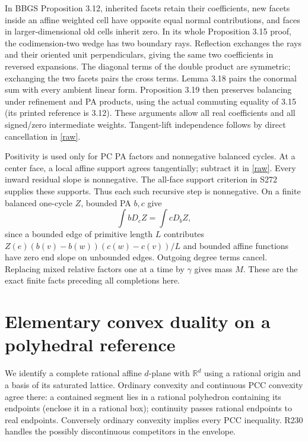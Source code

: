 \documentclass[11pt]{article}
\newcommand{\R}{\mathbb R}
\begin{document}
In BBGS Proposition 3.12, inherited facets retain their coefficients,
new facets inside an affine weighted cell have opposite equal normal
contributions, and faces in larger-dimensional old cells inherit zero.
In its whole Proposition 3.15 proof, the codimension-two wedge has two
boundary rays. Reflection exchanges the rays and their oriented unit
perpendiculars, giving the same two coefficients in reversed expansions.
The diagonal terms of the double product are symmetric; exchanging the
two facets pairs the cross terms. Lemma 3.18 pairs the conormal sum with
every ambient linear form. Proposition 3.19 then preserves balancing
under refinement and PA products, using the actual commuting equality
of 3.15 (its printed reference is 3.12). These arguments allow all real
coefficients and all signed/zero intermediate weights. Tangent-lift
independence follows by direct cancellation in \eqref{raw}.

Positivity is used only for PC PA factors and nonnegative balanced
cycles. At a center face, a local affine support agrees tangentially;
subtract it in \eqref{raw}. Every inward residual slope is nonnegative.
The all-face support criterion in S272 supplies these supports. Thus
each such recursive step is nonnegative. On a finite balanced one-cycle
$Z$, bounded PA $b,c$ give
\[
 \int bD_c Z=\int cD_b Z,
\]
since a bounded edge of primitive length $L$ contributes
$Z(e)(b(v)-b(w))(c(w)-c(v))/L$ and bounded affine functions have zero
end slope on unbounded edges. Outgoing degree terms cancel. Replacing
mixed relative factors one at a time by $\gamma$ gives mass $M$.
These are the exact finite facts preceding all completions here.

\section{Elementary convex duality on a polyhedral reference}
We identify a complete rational affine $d$-plane with $\R^d$ using a
rational origin and a basis of its saturated lattice. Ordinary convexity
and continuous PCC convexity agree there: a contained segment lies in
a rational polyhedron containing its endpoints (enclose it in a rational
box); continuity passes rational endpoints to real endpoints. Conversely
ordinary convexity implies every PCC inequality. R230 handles the
possibly discontinuous competitors in the envelope.
\end{document}
